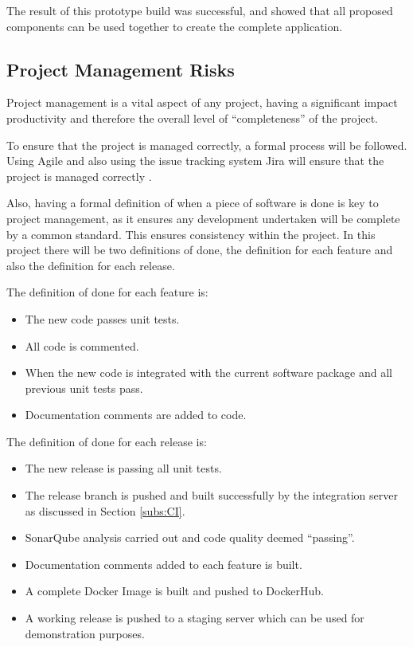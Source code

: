 The result of this prototype build was successful, and showed that all proposed components can be used together to create the complete application. 

\subsection{Project Management Risks}
Project management is a vital aspect of any project, having a significant impact productivity and therefore the overall level of ``completeness'' of the project. 

To ensure that the project is managed correctly, a formal process will be followed. Using Agile and also using the issue tracking system Jira will ensure that the project is managed correctly \citep{JBoss2016}. 

Also, having a formal definition of when a piece of software is done is key to project management, as it ensures any development undertaken will be complete by a common standard. This ensures consistency within the project. In this project there will be two definitions of done, the definition for each feature and also the definition for each release.

The definition of done for each feature is:
\begin{itemize}
	\item The new code passes unit tests.
	\item All code is commented.
	\item When the new code is integrated with the current software package and all previous unit tests pass.
	\item Documentation comments are added to code.
\end{itemize}

The definition of done for each release is:
\begin{itemize}
	\item The new release is passing all unit tests.
	\item The release branch is pushed and built successfully by the integration server as discussed in Section \ref{subs:CI}.
	\item SonarQube analysis carried out and code quality deemed ``passing''.
	\item Documentation comments added to each feature is built.
	\item A complete Docker Image is built and pushed to DockerHub.
	\item A working release is pushed to a staging server which can be used for demonstration purposes.
\end{itemize}
